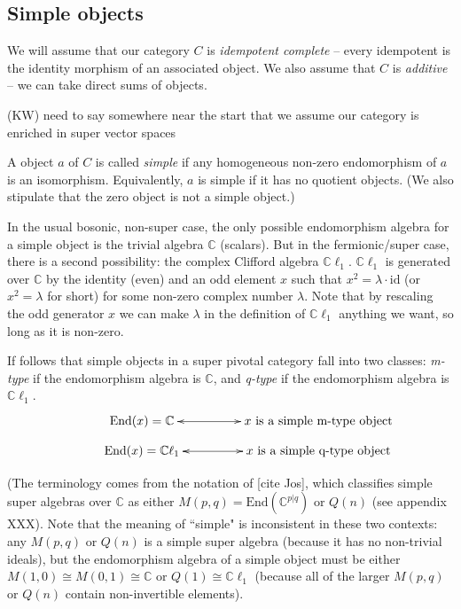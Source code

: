 \documentclass[12pt,a4paper]{article}
\newcommand{\cc}{\mathbb{C}}
\newcommand{\id}{\text{id}}
\newcommand{\End}{\text{End}}
\newcommand{\cl}{\mathbb{C}\ell}
\newcommand{\kw}[1]{{\color{kwcolor}\footnotesize{(KW) #1}}}
\begin{document}
\subsection{Simple objects}

We will assume that our category $C$ is {\it idempotent complete} -- 
every idempotent is the identity morphism of an associated object.
We also assume that $C$ is {\it additive} -- we can take direct sums of objects.

\kw{need to say somewhere near the start that we assume our category is enriched in super vector spaces}

A object $a$ of $C$ is called {\it simple} if any homogeneous non-zero endomorphism of $a$ is an isomorphism.
Equivalently, $a$ is simple if it has no quotient objects.
(We also stipulate that the zero object is not a simple object.)

In the usual bosonic, non-super case, the only possible endomorphism algebra for a simple object
is the trivial algebra $\cc$ (scalars).
But in the fermionic/super case, there is a second possibility: the complex Clifford algebra $\cl_1$.
$\cl_1$ is generated over $\cc$ by the identity (even) and an odd element $x$ such that $x^2 = \lambda \cdot \id$
(or $x^2 = \lambda$ for short) for some non-zero complex number $\lambda$.
Note that by rescaling the odd generator $x$ we can make $\lambda$ in the definition of $\cl_1$ anything we want, so long
as it is non-zero.

If follows that simple objects in a super pivotal category fall into two classes: {\it m-type} if the endomorphism algebra
is $\cc$, and {\it q-type} if the endomorphism algebra is $\cl_1$.
\begin{align}
\vcenter{\xymatrix @!0 @M=1mm @C=25mm{
& \text{End}(x) = \mathbb{C} \ar@{<->}[rr] &   &\text{$x$ is a simple m-type object}&  \\
&\text{End}(x) = \mathbb{C} \ell_1 \ar@{<->}[rr]  &  &\text{$x$ is a simple q-type object}&
	}}
\end{align}

(The terminology comes from the notation of [cite Jos], which classifies simple super algebras over $\cc$ as either
$M(p,q) = \End(\cc^{p|q})$ or $Q(n)$ (see appendix XXX).
Note that the meaning of ``simple" is inconsistent in these two contexts: any $M(p,q)$ or $Q(n)$ is a simple super algebra
(because it has no non-trivial ideals), but the endomorphism algebra of a simple object must be either
$M(1,0) \cong M(0,1) \cong \cc$ or $Q(1) \cong \cl_1$ 
(because all of the larger $M(p,q)$ or $Q(n)$ contain non-invertible elements).
\end{document}
